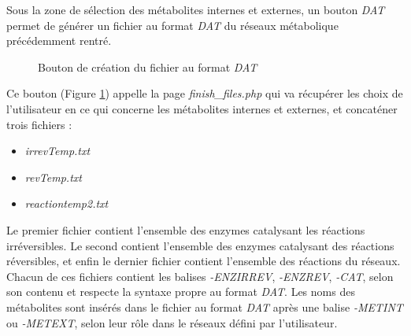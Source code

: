 Sous la zone de sélection des métabolites internes et externes, un bouton \emph{DAT} permet de générer un fichier au format \emph{DAT} du réseaux métabolique précédemment rentré. \\

\begin{figure}[!ht]
    \begin{center}
        \caption{Bouton de création du fichier au format \emph{DAT}}
          \label{boutonDAT}
      \end{center}   
\end{figure}

Ce bouton (Figure \ref{boutonDAT}) appelle la page \emph{finish\_files.php} qui va  récupérer les choix de l'utilisateur en ce qui concerne les métabolites internes et externes, et concaténer trois fichiers :
\begin{itemize}
\item \emph{irrevTemp.txt}
\item \emph{revTemp.txt}
\item \emph{reactiontemp2.txt}
\end{itemize}

Le premier fichier contient l'ensemble des enzymes catalysant les réactions irréversibles. Le second contient l'ensemble des enzymes catalysant des réactions réversibles, et enfin le dernier fichier contient l'ensemble des réactions du réseaux. \\
Chacun de ces fichiers contient les balises \emph{-ENZIRREV}, \emph{-ENZREV}, \emph{-CAT}, selon son contenu et respecte la syntaxe propre au format \emph{DAT}.
Les noms des métabolites sont insérés dans le fichier au format \emph{DAT} après une balise \emph{-METINT} ou \emph{-METEXT}, selon leur rôle dans le réseaux défini par l'utilisateur.

